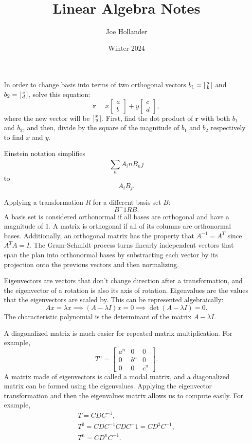 \documentclass{article}
\title{Linear Algebra Notes}
\author{Joe Hollander}
\date{Winter 2024}
\begin{document}
\maketitle 

\newcommand{\tdv}[2]{
    \begin{bmatrix}
        #1 \\
        #2
    \end{bmatrix}}

\newcommand{\iltdv}[2]{
    \begin{bsmallmatrix}
        #1 \\
        #2
    \end{bsmallmatrix}}

In order to change basis into terms of two orthogonal vectors $b_1 = \iltdv{a}{b}$ and $b_2 = \iltdv{c}{d}$, 
solve this equation:
\[
\mathbf{r} = x\tdv{a}{b} + y\tdv{c}{d},
\]
where the new vector will be $\iltdv{x}{y}$. 
First, find  the dot product of $\mathbf{r}$ with both $b_1$ and $b_2$,
and then, divide by the square of the magnitude of $b_1$ and $b_2$ respectively to find $x$ and $y$.

Einstein notation simplifies
\[
\sum_{n}^{} A_in B_nj 
\]
to \[A_i B_j.\]

Applying a transformation $R$ for a different basis set $B$:
\[
B^-1 RB.
\]
A basis set is considered orthonormal if all bases are orthogonal and have a magnitude of 1.
A matrix is orthogonal if all of its columns are orthonormal bases.
Additionally, an orthogonal matrix has the property that $A^{-1} = A^T$ since $A^TA = I$.
The Gram-Schmidt process turns linearly independent vectors that span the plan
into orthonormal bases by substracting each vector by its projection onto the previous vectors
and then normalizing. 

Eigenvectors are vectors that don't change direction after a transformation,
and the eigenvector of a rotation is also its axis of rotation.
Eigenvalues are the values that the eigenvectors are scaled by.
This can be represented algebraically:
\[
Ax = \lambda x \implies (A - \lambda I)x = 0 \implies \det(A - \lambda I) = 0.
\]   
The characteristic polynomial is the determinant of the matrix $A - \lambda I$.

A diagonalized matrix is much easier for repeated matrix multiplication.
For example,
\[
T^n = 
\begin{bmatrix} 
    a^n & 0 & 0 \\
    0 & b^n & 0 \\
    0 & 0 & c^n
\end{bmatrix}.
\]
A matrix made of eigenvectors is called a modal matrix,
and a diagonalized matrix can be formed using the eigenvalues. 
Applying the eigenvector transformation and then the eigenvalues matrix
allows us to compute easily. For example, 
\begin{gather}
    T = CDC^{-1}, \nonumber \\ 
    T^2 = CDC^{-1}CDC^-1 = CD^2C^{-1}, \nonumber \\
    T^n  = CD^nC^{-1}. \nonumber
\end{gather}
\end{document}
